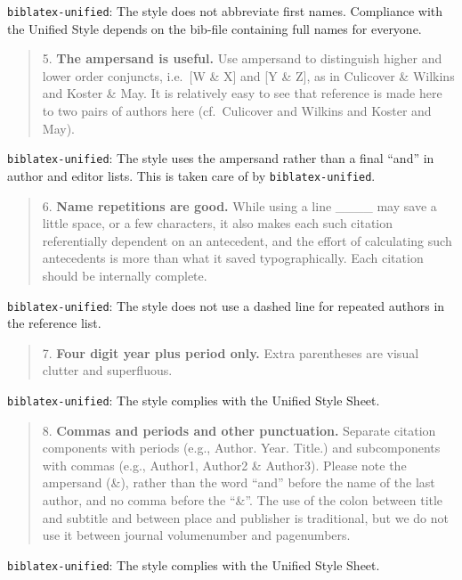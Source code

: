 \documentclass[
]{article}
\begin{document}
\texttt{biblatex-unified}: The style does not abbreviate first names.
Compliance with the Unified Style depends on the bib-file containing
full names for everyone.

\begin{quote}
5. \textbf{The ampersand is useful.} Use ampersand to distinguish higher
and lower order conjuncts, i.e.~{[}W \& X{]} and {[}Y \& Z{]}, as in
Culicover \& Wilkins and Koster \& May. It is relatively easy to see
that reference is made here to two pairs of authors here (cf.~Culicover
and Wilkins and Koster and May).
\end{quote}

\texttt{biblatex-unified}: The style uses the ampersand rather than a
final ``and'' in author and editor lists. This is taken care of by
\texttt{biblatex-unified}.

\begin{quote}
6. \textbf{Name repetitions are good.} While using a line \_\_\_\_ may
save a little space, or a few characters, it also makes each such
citation referentially dependent on an antecedent, and the effort of
calculating such antecedents is more than what it saved typographically.
Each citation should be internally complete.
\end{quote}

\texttt{biblatex-unified}: The style does not use a dashed line for
repeated authors in the reference list.

\begin{quote}
7. \textbf{Four digit year plus period only.} Extra parentheses are
visual clutter and superfluous.
\end{quote}

\texttt{biblatex-unified}: The style complies with the Unified Style
Sheet.

\begin{quote}
8. \textbf{Commas and periods and other punctuation.} Separate citation
components with periods (e.g., Author. Year. Title.) and subcomponents
with commas (e.g., Author1, Author2 \& Author3). Please note the
ampersand (\&), rather than the word ``and'' before the name of the last
author, and no comma before the ``\&''. The use of the colon between
title and subtitle and between place and publisher is traditional, but
we do not use it between journal volumenumber and pagenumbers.
\end{quote}

\texttt{biblatex-unified}: The style complies with the Unified Style
Sheet.
\end{document}
